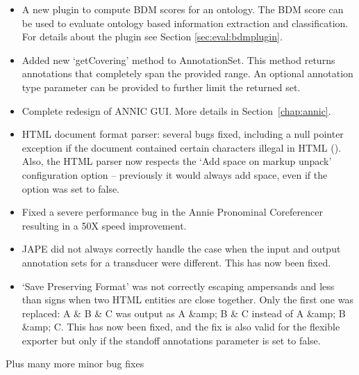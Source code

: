 \begin{itemize}
\item A new plugin to compute BDM scores for an ontology. The BDM score
  can be used to evaluate ontology based information extraction and
  classification. For details about the plugin see Section
  \ref{sec:eval:bdmplugin}.

\item Added new `getCovering' method to AnnotationSet.  This method returns
  annotations that completely span the provided range.  An optional annotation
  type parameter can be provided to further limit the returned set.

\item Complete redesign of ANNIC GUI. More details in
  Section~\ref{chap:annic}.
\end{itemize}


\begin{itemize}
\item HTML document format parser: several bugs fixed, including a
  null pointer exception if the document contained certain characters illegal
  in HTML
  ().
  Also, the HTML parser now respects the `Add space on markup unpack'
  configuration option -- previously it would always add space, even if the
  option was set to false.
  
\item Fixed a severe performance bug in the Annie Pronominal Coreferencer
  resulting in a 50X speed improvement.

\item JAPE did not always correctly handle the case when the input and output
  annotation sets for a transducer were different.  This has now been fixed.

\item `Save Preserving Format' was not correctly escaping ampersands
  and less than signs when two HTML entities are close together. Only the first
  one was replaced: A \& B \& C was output as A \&amp; B \& C instead of A
  \&amp; B \&amp; C. This has now been fixed, and the fix is also valid for the
  flexible exporter but only if the standoff annotations parameter is set to
  false.
\end{itemize}

Plus many more minor bug fixes

